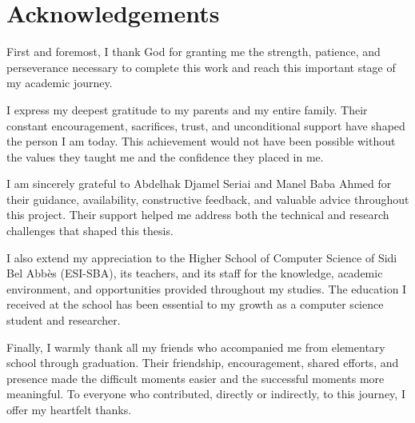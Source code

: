 \chapter*{Acknowledgements}

First and foremost, I thank God for granting me the strength, patience, and
perseverance necessary to complete this work and reach this important stage of
my academic journey.

I express my deepest gratitude to my parents and my entire family. Their
constant encouragement, sacrifices, trust, and unconditional support have
shaped the person I am today. This achievement would not have been possible
without the values they taught me and the confidence they placed in me.

I am sincerely grateful to Abdelhak Djamel Seriai and Manel Baba Ahmed for their
guidance, availability, constructive feedback, and valuable advice throughout
this project. Their support helped me address both the technical and research
challenges that shaped this thesis.

I also extend my appreciation to the Higher School of Computer Science of Sidi
Bel Abbès (ESI-SBA), its teachers, and its staff for the knowledge, academic
environment, and opportunities provided throughout my studies. The education I
received at the school has been essential to my growth as a computer science
student and researcher.

Finally, I warmly thank all my friends who accompanied me from elementary
school through graduation. Their friendship, encouragement, shared efforts,
and presence made the difficult moments easier and the successful moments more
meaningful. To everyone who contributed, directly or indirectly, to this
journey, I offer my heartfelt thanks.
